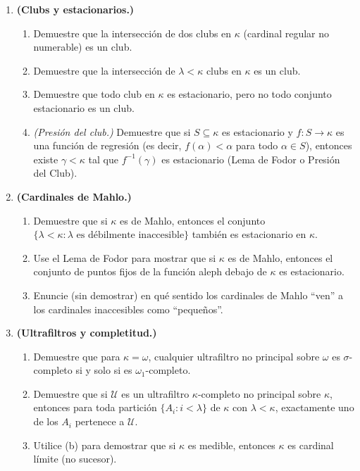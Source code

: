 \begin{enumerate}[leftmargin=2em, label=\textbf{P\arabic*.}]
  \item \textbf{(Clubs y estacionarios.)}
  \begin{enumerate}[label=(\alph*)]
    \item Demuestre que la intersección de dos clubs en $\kappa$ (cardinal regular no numerable) es un club.
    \item Demuestre que la intersección de $\lambda < \kappa$ clubs en $\kappa$ es un club.
    \item Demuestre que todo club en $\kappa$ es estacionario, pero no todo conjunto estacionario es un club.
    \item \textit{(Presión del club.)} Demuestre que si $S \subseteq \kappa$ es estacionario y $f: S \to \kappa$ es una función de regresión (es decir, $f(\alpha) < \alpha$ para todo $\alpha \in S$), entonces existe $\gamma < \kappa$ tal que $f^{-1}(\gamma)$ es estacionario (Lema de Fodor o Presión del Club).
  \end{enumerate}

  \item \textbf{(Cardinales de Mahlo.)}
  \begin{enumerate}[label=(\alph*)]
    \item Demuestre que si $\kappa$ es de Mahlo, entonces el conjunto $\{\lambda < \kappa : \lambda \text{ es débilmente inaccesible}\}$ también es estacionario en $\kappa$.
    \item Use el Lema de Fodor para mostrar que si $\kappa$ es de Mahlo, entonces el conjunto de puntos fijos de la función aleph debajo de $\kappa$ es estacionario.
    \item Enuncie (sin demostrar) en qué sentido los cardinales de Mahlo ``ven'' a los cardinales inaccesibles como ``pequeños''.
  \end{enumerate}

  \item \textbf{(Ultrafiltros y completitud.)}
  \begin{enumerate}[label=(\alph*)]
    \item Demuestre que para $\kappa = \omega$, cualquier ultrafiltro no principal sobre $\omega$ es $\sigma$-completo si y solo si es $\omega_1$-completo.
    \item Demuestre que si $\mathcal{U}$ es un ultrafiltro $\kappa$-completo no principal sobre $\kappa$, entonces para toda partición $\{A_i : i < \lambda\}$ de $\kappa$ con $\lambda < \kappa$, exactamente uno de los $A_i$ pertenece a $\mathcal{U}$.
    \item Utilice (b) para demostrar que si $\kappa$ es medible, entonces $\kappa$ es cardinal límite (no sucesor).
  \end{enumerate}


\end{enumerate}
